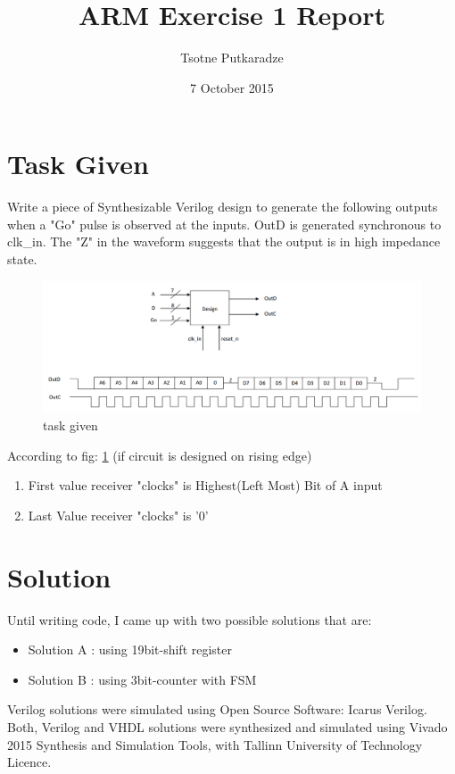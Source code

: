 \documentclass{article}
\title{ARM Exercise 1 Report}
\author{Tsotne Putkaradze}
\date{7 October 2015}
\begin{document}
\maketitle


\section{Task Given}
Write a piece of Synthesizable Verilog design to generate the following outputs when a "Go" pulse is observed at the inputs. OutD is generated synchronous to clk\_in. The "Z" in the waveform suggests that the output is in high impedance state.

\begin{figure}[H]
\centering
\includegraphics[width=\textwidth] {task_arm.png}
\caption{task given}
\label{fig:task_arm}
\end{figure}

According to fig: \ref{fig:task_arm} (if circuit is designed on rising edge)
\begin{enumerate}
\item First value receiver "clocks" is Highest(Left Most) Bit of A input
\item Last Value receiver "clocks" is '0' 
\end{enumerate}

\newpage
\section{Solution}
Until writing code, I came up with two possible solutions that are: 
\begin{itemize}
\item Solution A : using 19bit-shift register
\item Solution B : using 3bit-counter with FSM
\end{itemize}

Verilog solutions were simulated using Open Source Software: Icarus Verilog.
Both, Verilog and VHDL solutions were synthesized and simulated using Vivado 2015 Synthesis and Simulation Tools, with Tallinn University of Technology Licence. 
\end{document}

